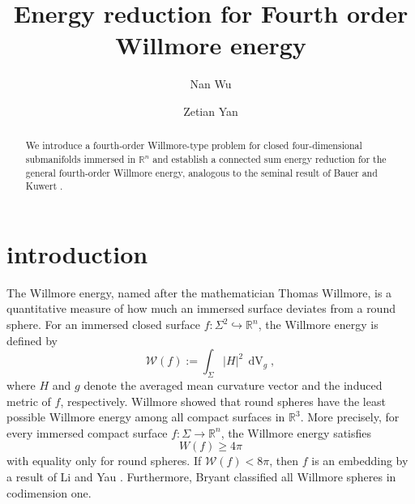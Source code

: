 \documentclass[11pt,letterpaper]{amsart}
\DeclareMathOperator{\dvol}{dV}
\newcommand{\bR}{\mathbb{R}}
\theoremstyle{definition}
\theoremstyle{remark}
\numberwithin{equation}{section}
\begin{document}
\title{Energy reduction for Fourth order Willmore energy}

\author[N. Wu]{Nan Wu}
\address[N. Wu]{Department of Mathematics \\ University of Notre Dame \\ Notre Dame \\ IN 46656 \\ USA}

\author[Z. Yan]{Zetian Yan}
\address[Z. Yan]{Department of Mathematics \\ UC Santa Barbara \\ Santa Barbara \\ CA 93106 \\ USA}


\begin{abstract}
We introduce a fourth-order Willmore-type problem for closed four-dimensional submanifolds immersed in $\bR^n$ and establish a connected sum energy reduction for the general fourth-order Willmore energy, analogous to the seminal result of Bauer and Kuwert \cite{Bauer-Kuwert03}. 
 
\end{abstract}
\maketitle

\section{introduction}
The Willmore energy, named after the mathematician Thomas Willmore, is a quantitative measure of how much an immersed surface deviates from a round sphere.
For an immersed closed surface \( f \colon \Sigma^2 \hookrightarrow \mathbb{R}^n \), the Willmore energy is defined by
\begin{equation*}
    \mathcal{W}(f) := \int_{\Sigma} |H|^2 \, \dvol_g,
\end{equation*}
where \( H \) and \( g \) denote the averaged mean curvature vector and the induced metric of \( f \), respectively.
Willmore showed that round
spheres have the least possible Willmore energy among all compact surfaces
in $\mathbb{R}^3$. More precisely, for every immersed compact surface $f:\Sigma \to \mathbb{R}^n$, the Willmore energy satisfies
\begin{equation*}
W(f) \geq 4 \pi
\end{equation*}
with equality only for round spheres. If \( \mathcal{W}(f) < 8\pi \), then \( f \) is an embedding by a result of Li and Yau \cite{Li-Yau82}. Furthermore, Bryant \cite{Bryant84} classified all Willmore spheres in codimension one.
\end{document}
